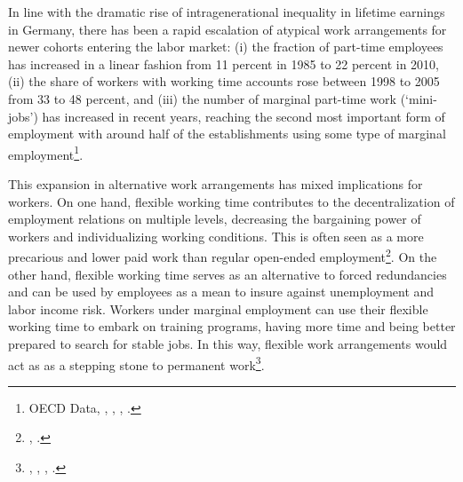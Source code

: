 \documentclass[12pt, a4paper]{article}
\begin{document}
In line with the dramatic rise of intragenerational inequality in lifetime earnings in Germany, there has been a rapid escalation of atypical work arrangements for newer cohorts entering the labor market: (i) the fraction of part-time employees has increased in a linear fashion from 11 percent in 1985 to 22 percent in 2010, (ii) the share of workers with working time accounts rose between 1998 to 2005 from 33 to 48 percent, and (iii) the number of marginal part-time work (`mini-jobs') has increased in recent years, reaching the second most important form of employment with around half of the establishments using some type of marginal employment\footnote{OECD Data, \cite{Gro2006}, \cite{Bechmann10}, \cite{CarriTuRo15}, \cite{Galasi16}.}.


This expansion in alternative work arrangements has mixed implications for workers. On one hand, flexible working time contributes to the decentralization of employment relations on multiple levels, decreasing the bargaining power of workers and individualizing working conditions. This is often seen as a more precarious and lower paid work than regular open-ended employment\footnote{\cite{AddisonCotti15}, \cite{DuSpOe14}.}. On the other hand, flexible working time serves as an alternative to forced redundancies and can be used by employees as a mean to insure against unemployment and labor income risk. Workers under marginal employment can use their flexible working time to embark on training programs, having more time and being better prepared to search for stable jobs. In this way, flexible work arrangements would act as as a stepping stone to permanent work\footnote{\cite{Berg2008}, \cite{Seifert2006}, \cite{Caliendo2016}, \cite{Booth02}.}.




\end{document}
